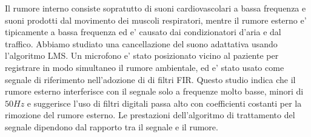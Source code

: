 Il rumore interno consiste sopratutto di suoni cardiovascolari a bassa frequenza e suoni prodotti dal movimento dei muscoli respiratori, mentre il rumore esterno e' tipicamente a bassa frequenza ed e' causato dai condizionatori d'aria e dal traffico. Abbiamo studiato una cancellazione del suono adattativa usando l'algoritmo LMS. Un microfono e' stato posizionato vicino al paziente per registrare in modo simultaneo il rumore ambientale, ed e' stato usato come segnale di riferimento nell'adozione di di filtri FIR. Questo studio indica che il rumore esterno interferisce con il segnale solo a frequenze molto basse, minori di $50Hz$ e suggerisce l'uso di filtri digitali passa alto con coefficienti costanti per la rimozione del rumore esterno. Le prestazioni dell'algoritmo di trattamento del segnale dipendono dal rapporto tra il segnale e il rumore.


